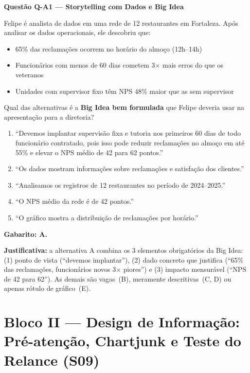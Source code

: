 \begin{SolvedBox}
\textbf{Questão Q-A1 — Storytelling com Dados e Big Idea}

Felipe é analista de dados em uma rede de 12 restaurantes em Fortaleza. Após analisar
os dados operacionais, ele descobriu que:
\begin{itemize}
  \item 65\% das reclamações ocorrem no horário do almoço (12h–14h)
  \item Funcionários com menos de 60 dias cometem 3$\times$ mais erros do que os veteranos
  \item Unidades com supervisor fixo têm NPS 48\% maior que as sem supervisor
\end{itemize}

Qual das alternativas é a \textbf{Big Idea bem formulada} que Felipe deveria usar na
apresentação para a diretoria?

\begin{enumerate}[label=\Alph*)]
  \item ``Devemos implantar supervisão fixa e tutoria nos primeiros 60 dias de todo
  funcionário contratado, pois isso pode reduzir reclamações no almoço em até 55\%
  e elevar o NPS médio de 42 para 62 pontos.''
  \item ``Os dados mostram informações sobre reclamações e satisfação dos clientes.''
  \item ``Analisamos os registros de 12 restaurantes no período de 2024–2025.''
  \item ``O NPS médio da rede é de 42 pontos.''
  \item ``O gráfico mostra a distribuição de reclamações por horário.''
\end{enumerate}

\textbf{Gabarito: A.}

\textbf{Justificativa:} a alternativa A combina os 3 elementos obrigatórios da Big Idea:
(1) ponto de vista (``devemos implantar''), (2) dado concreto que justifica (``65\% das
reclamações, funcionários novos 3$\times$ piores'') e (3) impacto mensurável (``NPS de 42
para 62''). As demais são vagas~(B), meramente descritivas~(C, D) ou apenas rótulo de
gráfico~(E).
\end{SolvedBox}

\section{Bloco II — Design de Informação: Pré-atenção, Chartjunk e Teste do Relance (S09)}

